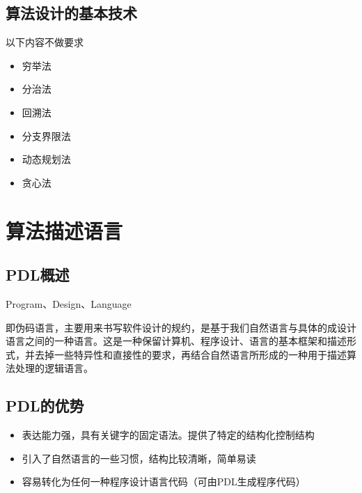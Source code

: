 \documentclass[AutoFakeBold]{LZUThesis2007}
\begin{document}
		\subsection{算法设计的基本技术}
			以下内容不做要求
			\begin{itemize}
				\item 穷举法
				\item 分治法
				\item 回溯法
				\item 分支界限法
				\item 动态规划法
				\item 贪心法
			\end{itemize}

	\section{算法描述语言}
		\subsection{PDL概述}

			Program、Design、Language

			即伪码语言，主要用来书写软件设计的规约，是基于我们自然语言与具体的成设计语言之间的一种语言。这是一种保留计算机、程序设计、语言的基本框架和描述形式，并去掉一些特异性和直接性的要求，再结合自然语言所形成的一种用于描述算法处理的逻辑语言。

		\subsection{PDL的优势}
			\begin{itemize}
				\item 表达能力强，具有关键字的固定语法。提供了特定的结构化控制结构
				\item 引入了自然语言的一些习惯，结构比较清晰，简单易读
				\item 容易转化为任何一种程序设计语言代码（可由PDL生成程序代码）
			\end{itemize}
\end{document}
